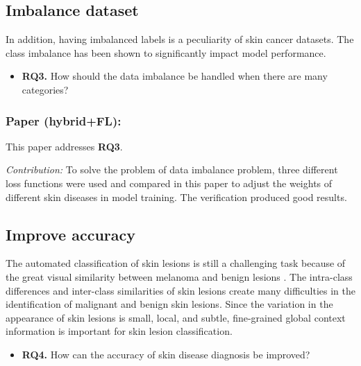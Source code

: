 \subsection{Imbalance dataset}

In addition, having imbalanced labels is a peculiarity of skin cancer datasets. The class imbalance has been shown to significantly impact model performance.

\begin{itemize} \label{sec.rq3}
    \item \textbf{RQ3.} How should the data imbalance be handled when there are many categories? 
\end{itemize}

\subsubsection {Paper \uppercase\expandafter{} (hybrid+FL):}
This paper addresses \textbf{RQ3}. 

\textit{Contribution: }
To solve the problem of data imbalance problem, three different loss functions were used and compared in this paper to adjust the weights of different skin diseases in model training. The verification produced good results. 


\subsection{Improve accuracy}
 The automated classification of skin lesions is still a challenging task because of the great visual similarity between melanoma and benign lesions \cite{hosny2022refined}. The intra-class differences and inter-class similarities of skin lesions create many difficulties in the identification of malignant and benign skin lesions. Since the variation in the appearance of skin lesions is small, local, and subtle, fine-grained global context information is important 
 for skin lesion classification.                                                                                     
\begin{itemize} \label{sec.rq4}
    \item \textbf{RQ4.} How can the accuracy of skin disease diagnosis be improved? 
\end{itemize}

